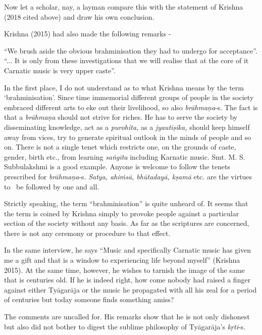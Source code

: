 Now let a scholar, nay, a layman compare this with the statement of Krishna (2018 cited above) and draw his own conclusion.

Krishna (2015) had also made the following remarks -  

\begin{myquote}
“We brush aside the obvious brahminisation they had to undergo for acceptance”. “... It is only from these investigations that we will realise that at the core of it Carnatic music is very upper caste”.
\end{myquote}

In the first place, I do not understand as to what Krishna means by the term ‘brahminisation’. Since time immemorial different groups of people in the society embraced different arts to eke out their livelihood, so also \textit{brāhmaṇa}-s. The fact is that a \textit{brāhmaṇa} should not strive for riches. He has to serve the society by disseminating knowledge, act as a \textit{purohita,} as a \textit{jyautiṣika,} should keep himself away from vices, try to generate spiritual outlook in the minds of people and so on. There is not a single tenet which restricts one, on the grounds of caste, gender, birth etc., from learning \textit{saṅgīta} including Karnatic music. Smt. M. S. Subbulakshmi is a good example. Anyone is welcome to follow the tenets prescribed for \textit{brāhmaṇa}-s. \textit{Satya, ahiṁsā, bhūtadayā, kṣamā} etc. are the virtues to  be followed by one and all. 

Strictly speaking, the term “brahminisation” is quite unheard of. It seems that the term is coined by Krishna simply to provoke people against a particular section of the society without any basis. As far as the scriptures are concerned, there is not any ceremony or procedure to that effect.

In the same interview, he says “Music and specifically Carnatic music has given me a gift and that is a window to experiencing life beyond myself” (Krishna 2015). At the same time, however, he wishes to tarnish the image of the same that is centuries old. If he is indeed right, how come nobody had raised a finger against either Tyāgarāja or the music he propagated with all his zeal for a period of centuries but today someone finds something amiss? 

The comments are uncalled for. His remarks show that he is not only dishonest but also did not bother to digest the sublime philosophy of Tyāgarāja’s \textit{kṛti}-s. 

